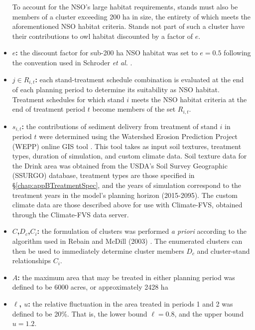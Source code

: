 \begin{itemize}
To account for the NSO's large habitat requirements, stands must also be members of a cluster exceeding 200 ha in size, the entirety of which meets the aforementioned NSO habitat criteria. Stands not part of such a cluster have their contributions to owl habitat discounted by a factor of $e$.
\item \textbf{$e$:} the discount factor for sub-200 ha NSO habitat was set to $e = 0.5$ following the convention used in Schroder \textit{et al.} \cite{schroder2016multi}.
\item \textbf{$j \in R_{i,t}$:} each stand-treatment schedule combination is evaluated at the end of each planning period to determine its suitability as NSO habitat. Treatment schedules for which stand $i$ meets the NSO habitat criteria at the end of treatment period $t$ become members of the set $R_{i,t}$. 
\item \textbf{$s_{i,t}$:} the contributions of sediment delivery from treatment of stand $i$ in period $t$ were determined using the Watershed Erosion Prediction Project (WEPP) online GIS tool \cite{frankenberger2011development}. This tool takes as input soil textures, treatment types, duration of simulation, and custom climate data. Soil texture data for the Drink area was obtained from the USDA's Soil Survey Geographic (SSURGO) database, treatment types are those specified in \S \ref{chap:appBTreatmentSpec}, and the years of simulation correspond to the treatment years in the model's planning horizon (2015-2095). The custom climate data are those described above for use with Climate-FVS, obtained through the Climate-FVS data server.
\item \textbf{$C$,$D_c$,$C_i$:} the formulation of clusters was performed \textit{a priori} according to the algorithm used in Rebain and McDill (2003) \cite{rebain2003mixed}. The enumerated clusters can then be used to immediately determine cluster members $D_c$ and cluster-stand relationships $C_i$.
\item \textbf{$A$:} the maximum area that may be treated in either planning period was defined to be 6000 acres, or approximately 2428 ha
\item \textbf{$\ell$, $u$:} the relative fluctuation in the area treated in periods 1 and 2 was defined to be 20\%. That is, the lower bound $\ell = 0.8$, and the upper bound $u = 1.2$.
\end{itemize}
